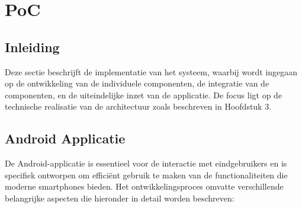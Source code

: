 \chapter{PoC}%
\label{ch:PoC}


\section{Inleiding}
Deze sectie beschrijft de implementatie van het systeem, waarbij wordt ingegaan op de ontwikkeling van de individuele componenten, de integratie van de componenten, en de uiteindelijke inzet van de applicatie. De focus ligt op de technische realisatie van de architectuur zoals beschreven in Hoofdstuk 3.


\section{Android Applicatie}
De Android-applicatie is essentieel voor de interactie met eindgebruikers en is specifiek ontworpen om efficiënt gebruik te maken van de functionaliteiten die moderne smartphones bieden. Het ontwikkelingsproces omvatte verschillende belangrijke aspecten die hieronder in detail worden beschreven:

